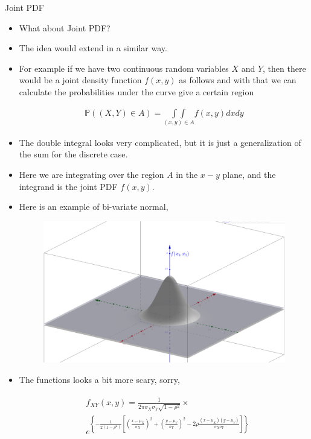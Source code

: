 \documentclass[8pt, usepdftitle = false]{beamer}
\begin{document}
\begin{frame}[allowframebreaks]{Joint PDF}
\begin{itemize}
  \item What about Joint PDF?

  \item The idea would extend in a similar way.

  \item For example if we have two continuous random variables $X$ and $Y$, then there would be a joint density function $f(x, y)$ as follows and with that we can calculate the probabilities under the curve give a certain region

  \begin{align*}
  \mathbb{P}((X, Y) \in A)={\int \int}\limits_{(x, y) \in A} f(x, y) d x d y
  \end{align*}

  \item The double integral looks very complicated, but it is just a generalization of the sum for the discrete case. 

  \item Here we are integrating over the region $A$ in the $x-y$ plane, and the integrand is the joint PDF $f(x, y)$. 

  \item Here is an example of bi-variate normal, 

  \begin{figure}
    \includegraphics[scale = .2]{Images/MVnorm.png}
  \end{figure}

  \item The functions looks a bit more scary, sorry,

  \begin{align*}
    \begin{aligned}
& f_{X Y}(x, y)=\frac{1}{2 \pi \sigma_X \sigma_Y \sqrt{1-\rho^2}} \times  \\
& e^{ \left\{-\frac{1}{2\left(1-\rho^2\right)}\left[\left(\frac{x-\mu_X}{\sigma_X}\right)^2+\left(\frac{y-\mu_Y}{\sigma_Y}\right)^2-2 \rho \frac{\left(x-\mu_X\right)\left(y-\mu_Y\right)}{\sigma_X \sigma_Y}\right]\right\}}
\end{aligned}
  \end{align*}


\end{itemize}
\end{frame}
\end{document}
